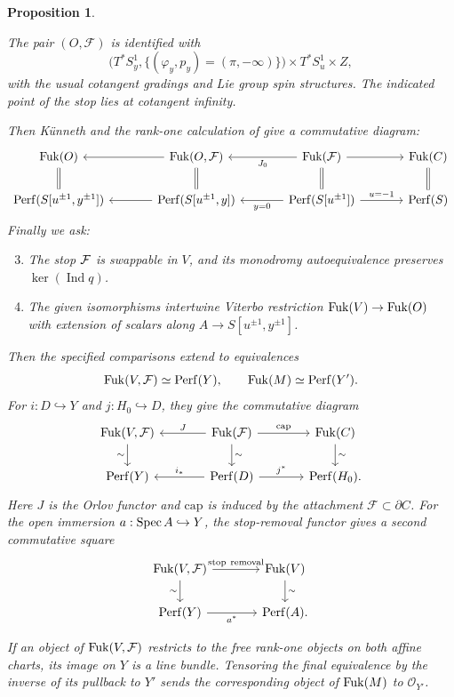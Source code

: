 \documentclass[12pt, letter]{amsart}
\newtheorem{proposition}[theorem]{Proposition}
\theoremstyle{definition}
\newcommand{\OO}{\mathcal O}
\DeclareMathOperator{\Ind}{Ind}
\numberwithin{equation}{section}
\begin{document}
\begin{proposition}
\begin{enumerate}[label=\textup{(G\arabic*)}]
The pair $(O,\mathcal F)$ is identified with
\[
 \bigl(T^*S^1_y,\{(\varphi_y,p_y)=(\pi,-\infty)\}\bigr)
      \times T^*S^1_u\times Z,
\]
with the usual cotangent gradings and Lie group spin structures.  
The indicated point of the stop lies at cotangent infinity.
\end{enumerate}
Then K\"unneth and the 
rank-one calculation of \cite[Corollary~4.10 and Example~4.11]{GLe} give a commutative diagram:
\begin{equation} \label{eq: rank one boosted}
 \begin{tikzcd}[column sep=large]
  \Fuk(O)  \arrow[d, equal] & \Fuk(O, \mathcal F) \arrow[d, equal] \arrow[l] & \Fuk(\mathcal F) \arrow[d, equal] \arrow[l, "J_0"] \arrow[r] & \Fuk(C) \arrow[d, equal] \\
  \Perf(S[u^{\pm1},y^{\pm1}]) & \Perf(S[u^{\pm1},y]) \arrow[l] & \Perf(S[u^{\pm1}]) \arrow[l, "y=0"] \arrow[r, "u=-1"]& \Perf(S) 
 \end{tikzcd}
\end{equation}
Finally we ask: 
\begin{enumerate}[label=\textup{(G\arabic*)}] 
\setcounter{enumi}{2}
\item\label{hyp:gluing-twist}
The stop $\mathcal{F}$  is swappable in $V$, and its monodromy autoequivalence preserves
$\ker(\Ind q)$.
\item \label{hyp:gluing-coherence} The given isomorphisms intertwine Viterbo restriction $\operatorname{Fuk}(V)\to\operatorname{Fuk}(O)$ with extension
of scalars along $A\to S[u^{\pm1},y^{\pm1}]$.
\end{enumerate}


Then the specified comparisons extend to equivalences
\[
 \operatorname{Fuk}(V,\mathcal F)\simeq\mathrm{Perf}(Y),\qquad
 \operatorname{Fuk}(M)\simeq\mathrm{Perf}(Y').
\]
For $i:D\hookrightarrow Y$ and $j:H_0\hookrightarrow D$, they
give the commutative diagram
\[
\begin{tikzcd}[column sep=large]
 \Fuk(V,\mathcal F)\arrow[d,"\sim"']
 &\Fuk(\mathcal F)\arrow[l,"J"']\arrow[r,"\mathrm{cap}"]
       \arrow[d,"\sim"]
 &\Fuk(C)\arrow[d,"\sim"]\\
 \Perf(Y)&\Perf(D)\arrow[l,"i_*"']\arrow[r,"j^*"]&\Perf(H_0).
\end{tikzcd}
\]
Here $J$ is the Orlov functor and $\mathrm{cap}$ is induced by
the attachment $\mathcal F\subset\partial C$.
For the open immersion $a:\operatorname{Spec} A\hookrightarrow Y$, the
stop-removal functor gives a second commutative square
\[
\begin{tikzcd}[column sep=large]
 \Fuk(V,\mathcal F)\arrow[r,"\mathrm{stop\ removal}"]
       \arrow[d,"\sim"']
 &\Fuk(V)\arrow[d,"\sim"]\\
 \Perf(Y)\arrow[r,"a^*"']&\Perf(A).
\end{tikzcd}
\]


If an object of $\operatorname{Fuk}(V,\mathcal F)$ restricts to the free rank-one
objects on both affine charts, its image on $Y$ is a line bundle.
Tensoring the final equivalence by the inverse of its pullback
to $Y'$ sends the corresponding object of $\operatorname{Fuk}(M)$ to $\OO_{Y'}$.
\end{proposition}
\end{document}

